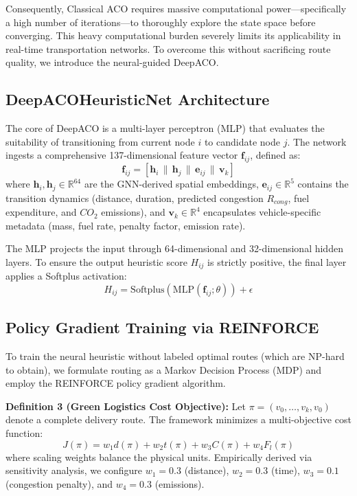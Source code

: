 \documentclass[conference]{IEEEtran}
\begin{document}
Consequently, Classical ACO requires massive computational power—specifically a high number of iterations—to thoroughly explore the state space before converging. This heavy computational burden severely limits its applicability in real-time transportation networks. To overcome this without sacrificing route quality, we introduce the neural-guided DeepACO.

\subsection{DeepACOHeuristicNet Architecture}
The core of DeepACO is a multi-layer perceptron (MLP) that evaluates the suitability of transitioning from current node $i$ to candidate node $j$. The network ingests a comprehensive 137-dimensional feature vector $\mathbf{f}_{ij}$, defined as:
\begin{equation}
    \mathbf{f}_{ij} = \left[ \mathbf{h}_i \,\|\, \mathbf{h}_j \,\|\, \mathbf{e}_{ij} \,\|\, \mathbf{v}_k \right]
\end{equation}
where $\mathbf{h}_i, \mathbf{h}_j \in \mathbb{R}^{64}$ are the GNN-derived spatial embeddings, $\mathbf{e}_{ij} \in \mathbb{R}^{5}$ contains the transition dynamics (distance, duration, predicted congestion $R_{cong}$, fuel expenditure, and $CO_2$ emissions), and $\mathbf{v}_k \in \mathbb{R}^{4}$ encapsulates vehicle-specific metadata (mass, fuel rate, penalty factor, emission rate).

The MLP projects the input through 64-dimensional and 32-dimensional hidden layers. To ensure the output heuristic score $H_{ij}$ is strictly positive, the final layer applies a Softplus activation:
\begin{equation}
    H_{ij} = \text{Softplus}\left( \text{MLP}(\mathbf{f}_{ij}; \theta) \right) + \epsilon
\end{equation}

\subsection{Policy Gradient Training via REINFORCE}
To train the neural heuristic without labeled optimal routes (which are NP-hard to obtain), we formulate routing as a Markov Decision Process (MDP) and employ the REINFORCE policy gradient algorithm.

\textbf{Definition 3 (Green Logistics Cost Objective):} Let $\pi = (v_0, \dots, v_k, v_0)$ denote a complete delivery route. The framework minimizes a multi-objective cost function:
\begin{equation}
    J(\pi) = w_1 d(\pi) + w_2 t(\pi) + w_3 C(\pi) + w_4 F_{l}(\pi)
\end{equation}
where scaling weights balance the physical units. Empirically derived via sensitivity analysis, we configure $w_1=0.3$ (distance), $w_2=0.3$ (time), $w_3=0.1$ (congestion penalty), and $w_4=0.3$ (emissions).
\end{document}
